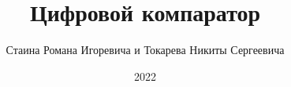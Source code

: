 \documentclass[spec, och, labwork]{shiza}
\begin{document}
\chair{}

\title{Цифровой компаратор}






\author{Стаина Романа Игоревича и Токарева Никиты Сергеевича}








\date{2022}

\maketitle

\end{document}
